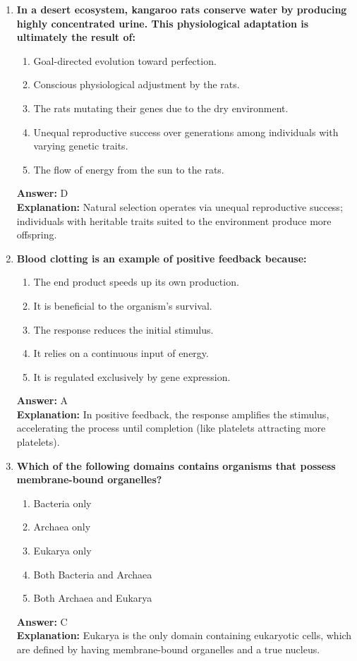 \documentclass[11pt, a4paper]{article}
\begin{document}
\begin{enumerate}
\item \textbf{In a desert ecosystem, kangaroo rats conserve water by producing highly concentrated urine. This physiological adaptation is ultimately the result of:}
\begin{enumerate}[label=\Alph*.]
    \item Goal-directed evolution toward perfection.
    \item Conscious physiological adjustment by the rats.
    \item The rats mutating their genes due to the dry environment.
    \item Unequal reproductive success over generations among individuals with varying genetic traits.
    \item The flow of energy from the sun to the rats.
\end{enumerate}
\textbf{Answer:} D \\
\textbf{Explanation:} Natural selection operates via unequal reproductive success; individuals with heritable traits suited to the environment produce more offspring.

\item \textbf{Blood clotting is an example of positive feedback because:}
\begin{enumerate}[label=\Alph*.]
    \item The end product speeds up its own production.
    \item It is beneficial to the organism's survival.
    \item The response reduces the initial stimulus.
    \item It relies on a continuous input of energy.
    \item It is regulated exclusively by gene expression.
\end{enumerate}
\textbf{Answer:} A \\
\textbf{Explanation:} In positive feedback, the response amplifies the stimulus, accelerating the process until completion (like platelets attracting more platelets).

\item \textbf{Which of the following domains contains organisms that possess membrane-bound organelles?}
\begin{enumerate}[label=\Alph*.]
    \item Bacteria only
    \item Archaea only
    \item Eukarya only
    \item Both Bacteria and Archaea
    \item Both Archaea and Eukarya
\end{enumerate}
\textbf{Answer:} C \\
\textbf{Explanation:} Eukarya is the only domain containing eukaryotic cells, which are defined by having membrane-bound organelles and a true nucleus.


\end{enumerate}
\end{document}
